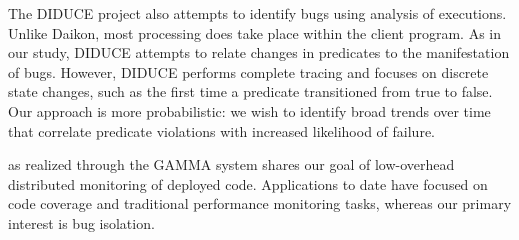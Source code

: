 The DIDUCE project \cite{Hangal:DIDUCE:2002} also attempts to identify
bugs using analysis of executions.  Unlike Daikon, most
processing does take place within the client program.  As in our
study, DIDUCE attempts to relate changes in predicates to the
manifestation of bugs.  However, DIDUCE performs complete tracing and
focuses on discrete state changes, such as the first time a predicate
transitioned from true to false.  Our approach is more probabilistic:
we wish to identify broad trends over time that correlate predicate
violations with increased likelihood of failure.

 as realized through the GAMMA system
\cite{PASTE'02*2} shares our goal of low-overhead distributed
monitoring of deployed code.  Applications to date have focused on
code coverage and traditional performance monitoring tasks, whereas
our primary interest is bug isolation.  

